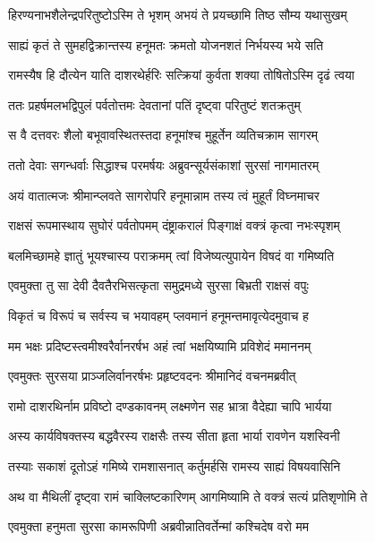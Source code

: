 \twolineshloka
{हिरण्यनाभशैलेन्द्रपरितुष्टोऽस्मि ते भृशम्}
{अभयं ते प्रयच्छामि तिष्ठ सौम्य यथासुखम्} %

\twolineshloka
{साह्यं कृतं ते सुमहद्विक्रान्तस्य हनूमतः}
{क्रमतो योजनशतं निर्भयस्य भये सति} %

\twolineshloka
{रामस्यैष हि दौत्येन याति दाशरथेर्हरिः}
{सत्क्रियां कुर्वता शक्या तोषितोऽस्मि दृढं त्वया} %

\twolineshloka
{ततः प्रहर्षमलभद्विपुलं पर्वतोत्तमः}
{देवतानां पतिं दृष्ट्वा परितुष्टं शतक्रतुम्} %

\twolineshloka
{स वै दत्तवरः शैलो बभूवावस्थितस्तदा}
{हनूमांश्च मुहूर्तेन व्यतिचक्राम सागरम्} %

\twolineshloka
{ततो देवाः सगन्धर्वाः सिद्धाश्च परमर्षयः}
{अब्रुवन्सूर्यसंकाशां सुरसां नागमातरम्} %

\twolineshloka
{अयं वातात्मजः श्रीमान्प्लवते सागरोपरि}
{हनूमान्नाम तस्य त्वं मुहूर्तं विघ्नमाचर} %

\twolineshloka
{राक्षसं रूपमास्थाय सुघोरं पर्वतोपमम्}
{दंष्ट्राकरालं पिङ्गाक्षं वक्त्रं कृत्वा नभःस्पृशम्} %

\twolineshloka
{बलमिच्छामहे ज्ञातुं भूयश्चास्य पराक्रमम्}
{त्वां विजेष्यत्युपायेन विषदं वा गमिष्यति} %

\twolineshloka
{एवमुक्ता तु सा देवी दैवतैरभिसत्कृता}
{समुद्रमध्ये सुरसा बिभ्रती राक्षसं वपुः} %

\twolineshloka
{विकृतं च विरूपं च सर्वस्य च भयावहम्}
{प्लवमानं हनूमन्तमावृत्येदमुवाच ह} %

\twolineshloka
{मम भक्षः प्रदिष्टस्त्वमीश्वरैर्वानरर्षभ}
{अहं त्वां भक्षयिष्यामि प्रविशेदं ममाननम्} %

\twolineshloka
{एवमुक्तः सुरसया प्राञ्जलिर्वानरर्षभः}
{प्रहृष्टवदनः श्रीमानिदं वचनमब्रवीत्} %

\twolineshloka
{रामो दाशरथिर्नाम प्रविष्टो दण्डकावनम्}
{लक्ष्मणेन सह भ्रात्रा वैदेह्या चापि भार्यया} %

\twolineshloka
{अस्य कार्यविषक्तस्य बद्धवैरस्य राक्षसैः}
{तस्य सीता हृता भार्या रावणेन यशस्विनी} %

\twolineshloka
{तस्याः सकाशं दूतोऽहं गमिष्ये रामशासनात्}
{कर्तुमर्हसि रामस्य साह्यं विषयवासिनि} %

\twolineshloka
{अथ वा मैथिलीं दृष्ट्वा रामं चाक्लिष्टकारिणम्}
{आगमिष्यामि ते वक्त्रं सत्यं प्रतिशृणोमि ते} %

\twolineshloka
{एवमुक्ता हनुमता सुरसा कामरूपिणी}
{अब्रवीन्नातिवर्तेन्मां कश्चिदेष वरो मम} %

